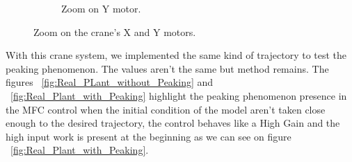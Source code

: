 \begin{figure}[htbp]
\begin{subfigure}{0.5\textwidth}
        \caption{Zoom on Y motor.}
        \label{fig:Y_Motor_Zoom}
    \end{subfigure}
    \caption{Zoom on the crane's X and Y motors.}
    \label{fig:Motors_Zoom}
\end{figure}


With this crane system, we implemented the same kind of trajectory to 
test the peaking phenomenon. The values aren't the same but method remains.
The figures ~\ref{fig:Real_PLant_without_Peaking} and 
~\ref{fig:Real_Plant_with_Peaking} highlight the peaking phenomenon
presence in the MFC control when the initial condition of the model aren't
taken close enough to the desired trajectory, the control behaves like a
High Gain and the high input work is present at the beginning as we can 
see on figure ~\ref{fig:Real_Plant_with_Peaking}.


